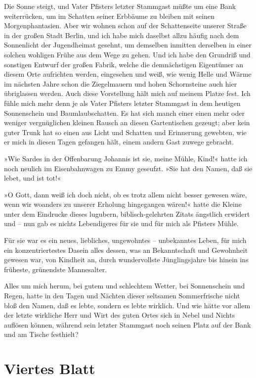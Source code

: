 Die Sonne steigt, und Vater Pfisters letzter Stammgast müßte um
eine Bank weiterrücken, um im Schatten seiner Erbbäume zu bleiben
mit seinen Morgenphantasien. Aber wir wohnen schon auf der
Schattenseite unserer Straße in der großen Stadt Berlin, und ich
habe mich daselbst allzu häufig nach dem Sonnenlicht der
Jugendheimat gesehnt, um demselben inmitten derselben in einer
solchen wohligen Frühe aus dem Wege zu gehen. Und ich habe den
Grundriß und sonstigen Entwurf der großen Fabrik, welche die
demnächstigen Eigentümer an diesem Orte aufrichten werden,
eingesehen und weiß, wie wenig Helle und Wärme im nächsten Jahre
schon die Ziegelmauern und hohen Schornsteine auch hier übriglassen
werden. Auch diese Vorstellung hält mich auf meinem Platze fest.
Ich fühle mich mehr denn je als Vater Pfisters letzter Stammgast in
dem heutigen Sonnenschein und Baumlaubschatten. Es hat sich manch
einer einen mehr oder weniger vergnüglichen kleinen Rausch an
diesen Gartentischen gezeugt; aber kein guter Trunk hat so einen
aus Licht und Schatten und Erinnerung gewebten, wie er mich in
diesen Tagen gefangen hält, einem andern Gast zuwege gebracht.

»Wie Sardes in der Offenbarung Johannis ist sie, meine Mühle,
Kind!« hatte ich noch neulich im Eisenbahnwagen zu Emmy geseufzt.
»Sie hat den Namen, daß sie lebet, und ist tot!«

»O Gott, dann weiß ich doch nicht, ob es trotz allem nicht besser
gewesen wäre, wenn wir woanders zu unserer Erholung hingegangen
wären!« hatte die Kleine unter dem Eindrucke dieses lugubern,
biblisch-gelehrten Zitats ängstlich erwidert und – nun gab es
nichts Lebendigeres für sie und für mich als Pfisters Mühle.

Für sie war es ein neues, liebliches, ungewohntes – unbekanntes
Leben, für mich ein konzentriertestes Dasein alles dessen, was an
Bekanntschaft und Gewohnheit gewesen war, von Kindheit an, durch
wundervollste Jünglingsjahre bis hinein ins früheste, grünendste
Mannesalter.

Alles um mich herum, bei gutem und schlechtem Wetter, bei
Sonnenschein und Regen, hatte in den Tagen und Nächten dieser
seltsamen Sommerfrische nicht bloß den Namen, daß es lebte, sondern
es lebte wirklich. Und wie hätte vor allem der letzte wirkliche
Herr und Wirt des guten Ortes sich in Nebel und Nichts auflösen
können, während sein letzter Stammgast noch seinen Platz auf der
Bank und am Tische festhielt?

\section{Viertes Blatt}

